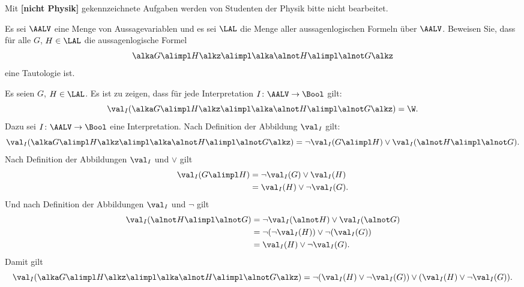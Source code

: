 \documentclass[12pt]{article}
\begin{document}
\noindent
Mit \textbf{[nicht Physik]} gekennzeichnete Aufgaben werden von
Studenten der Physik bitte nicht bearbeitet.\\

\begin{aufgabe}[3][Physik]
  Es sei $\AALV$ eine Menge von Aussagevariablen und es sei $\LAL$ die
  Menge aller aussagenlogischen Formeln über $\AALV$. Beweisen Sie, dass für alle
  $G$, $H \in \LAL$ die aussagenlogische Formel
  \begin{equation*}
    \alka G\alimpl H\alkz \alimpl \alka \alnot H \alimpl\alnot G\alkz
  \end{equation*}
  eine Tautologie ist.
\end{aufgabe}

\begin{loesung}
  Es seien $G$, $H \in \LAL$. Es ist zu zeigen, dass für jede Interpretation
  $I \colon \AALV \to \Bool$ gilt:
  \begin{equation*}
    \val_I(\alka G\alimpl H\alkz \alimpl \alka \alnot H \alimpl\alnot G\alkz) = \W.
  \end{equation*}
  Dazu sei $I \colon \AALV \to \Bool$ eine Interpretation. Nach Definition der
  Abbildung $\val_I$ gilt:
  \begin{equation*}
    \val_I(\alka G\alimpl H\alkz \alimpl \alka \alnot H \alimpl\alnot G\alkz)
    = \lnot \val_I(G\alimpl H) \lor \val_I(\alnot H \alimpl\alnot G).
  \end{equation*}
  Nach Definition der Abbildungen $\val_I$ und $\lor$ gilt
  \begin{align*}
    \val_I(G\alimpl H) &= \lnot \val_I(G) \lor \val_I(H)\\
                       &= \val_I(H) \lor \lnot \val_I(G).
  \end{align*}
  Und nach Definition der Abbildungen $\val_I$ und $\lnot$ gilt
  \begin{align*}
    \val_I(\alnot H \alimpl\alnot G) &= \lnot \val_I(\alnot H) \lor \val_I(\alnot G)\\
                                     &= \lnot (\lnot \val_I(H)) \lor \lnot (\val_I(G))\\
                                     &= \val_I(H) \lor \lnot \val_I(G).
  \end{align*}
  Damit gilt
  \begin{equation*}
    \val_I(\alka G\alimpl H\alkz \alimpl \alka \alnot H \alimpl\alnot G\alkz)
    = \lnot (\val_I(H) \lor \lnot \val_I(G)) \lor (\val_I(H) \lor \lnot \val_I(G)).

\end{equation*}
\end{loesung}
\end{document}
